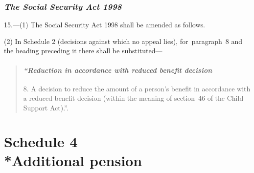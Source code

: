 \documentclass[12pt,a4paper]{article}
\begin{document}
\section*{\itshape The Social Security Act 1998}

15.---(1) The Social Security Act 1998 shall be amended as follows.

(2) In Schedule 2 (decisions against which no appeal lies), for~paragraph~8 and the heading preceding it there shall be substituted—
\begin{quotation}
\subsection*{\itshape “Reduction in accordance with reduced benefit decision}

8. A decision to reduce the amount of a person’s benefit in accordance with a reduced benefit decision (within the meaning of section~46 of the Child Support Act).”.
\end{quotation}


\part[Schedule 4 --- Additional pension]{Schedule 4\\*Additional pension}

\renewcommand\parthead{--- Schedule 4}
\end{document}
